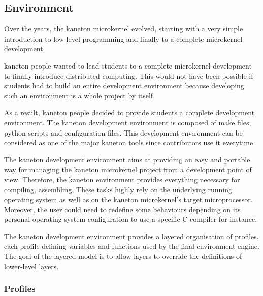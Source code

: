 %
%
%
%
%
%

%
%

\subsection{Environment}
\label{section:environment}

Over the years, the kaneton microkernel evolved, starting with a very simple
introduction to low-level programming and finally to a complete microkernel
development.

kaneton people wanted to lead students to a complete microkernel development
to finally introduce distributed computing. This would not have been possible
if students had to build an entire development environment because developing
such an environment is a whole project by itself.

As a result, kaneton people decided to provide students a complete development
environment. The kaneton development environment is composed of make files,
python scripts and configuration files. This development environment can be
considered as one of the major kaneton tools since contributors use it
everytime.

The kaneton development environment aims at providing an easy and portable
way for managing the kaneton microkernel project from a development point
of view. Therefore, the kaneton environment provides everything necessary
for compiling, assembling, \etc{} These tasks highly rely on the underlying
running operating system as well as on the kaneton microkernel's target
microprocessor. Moreover, the user could need to redefine some behaviours
depending on its personal operating system configuration to use a specific
C compiler for instance.

The kaneton development environment provides a layered organisation of
profiles, each profile defining variables and functions used by the final
environment engine. The goal of the layered model is to allow layers to
override the definitions of lower-level layers.

%
%

\subsubsection{Profiles}

